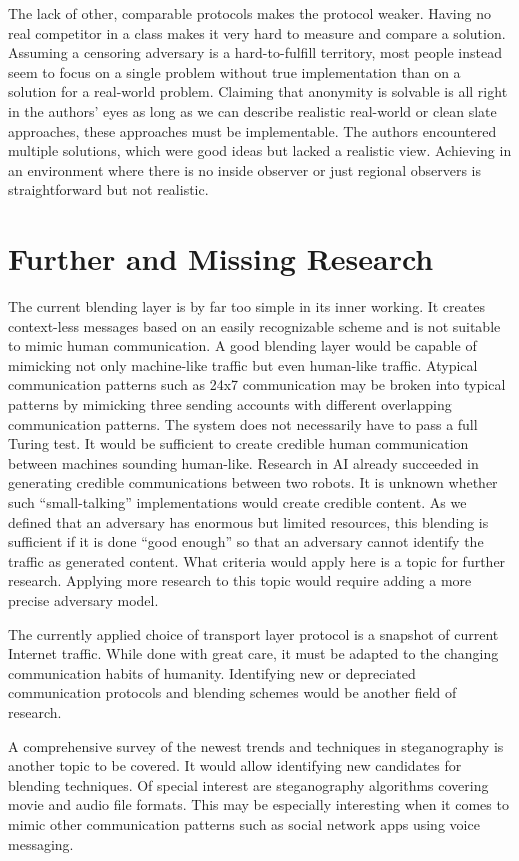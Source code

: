 The lack of other, comparable protocols makes the \MessageVortex{} protocol weaker. Having no real competitor in a class makes it very hard to measure and compare a solution. Assuming a censoring adversary is a hard-to-fulfill territory, most people instead seem to focus on a single problem without true implementation than on a solution for a real-world problem. Claiming that anonymity is solvable is all right in the authors' eyes as long as we can describe realistic real-world or clean slate approaches, these approaches must be implementable. The authors encountered multiple solutions, which were good ideas but lacked a realistic view. Achieving in an environment where there is no inside observer or just regional observers is straightforward but not realistic. 

\section{Further and Missing Research}
The current blending layer is by far too simple in its inner working. It creates context-less messages based on an easily recognizable scheme and is not suitable to mimic human communication. A good blending layer would be capable of mimicking not only machine-like traffic but even human-like traffic. Atypical communication patterns such as 24x7 communication may be broken into typical patterns by mimicking three sending accounts with different overlapping communication patterns. The system does not necessarily have to pass a full Turing test. It would be sufficient to create credible human communication between machines sounding human-like. Research in AI already succeeded in generating credible communications between two robots. It is unknown whether such ``small-talking'' implementations would create credible content. As we defined that an adversary has enormous but limited resources, this blending is sufficient if it is done ``good enough'' so that an adversary cannot identify the traffic as generated content. What criteria would apply here is a topic for further research. Applying more research to this topic would require adding a more precise adversary model.

The currently applied choice of transport layer protocol is a snapshot of current Internet traffic. While done with great care, it must be adapted to the changing communication habits of humanity. Identifying new or depreciated communication protocols and blending schemes would be another field of research.

A comprehensive survey of the newest trends and techniques in steganography is another topic to be covered. It would allow identifying new candidates for blending techniques. Of special interest are steganography algorithms covering movie and audio file formats. This may be especially interesting when it comes to mimic other communication patterns such as social network apps using voice messaging.


